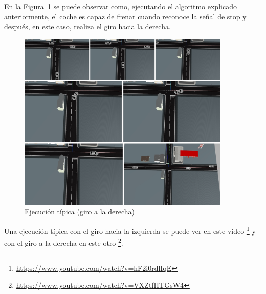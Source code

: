 En la Figura~\ref{fig.ejecucionFinal} se puede observar como, ejecutando el algoritmo explicado anteriormente, el coche es capaz de frenar cuando reconoce la señal de stop y después, en este caso, realiza el giro hacia la derecha. \\

\begin{figure}[H]
  \begin{center}
    \includegraphics[width=0.9\textwidth]{figures/Stop/ejecucionFinal.jpg}
		\caption{Ejecución típica (giro a la derecha)}
		\label{fig.ejecucionFinal}
		\end{center}
\end{figure}


Una ejecución típica con el giro hacia la izquierda se puede ver en este vídeo \footnote{\url{https://www.youtube.com/watch?v=hF2i0rdlIqE}} y con el giro a la derecha en este otro \footnote{\url{https://www.youtube.com/watch?v=VXZtfHTGsW4}}.
